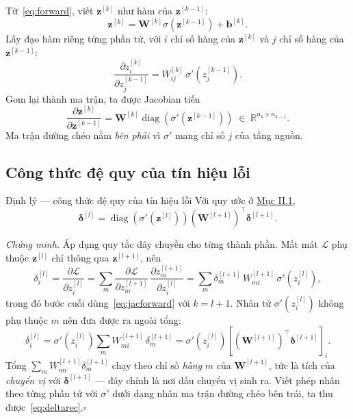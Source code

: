 Từ~\eqref{eq:forward}, viết $\mathbf{z}^{[k]}$ như hàm của
$\mathbf{z}^{[k-1]}$:
\[
  \mathbf{z}^{[k]}
  = \mathbf{W}^{[k]}\sigma\!\left(\mathbf{z}^{[k-1]}\right) + \mathbf{b}^{[k]}.
\]
Lấy đạo hàm riêng từng phần tử, với $i$ chỉ số hàng của $\mathbf{z}^{[k]}$ và $j$
chỉ số hàng của $\mathbf{z}^{[k-1]}$:
\[
  \frac{\partial z^{[k]}_i}{\partial z^{[k-1]}_j}
  = W^{[k]}_{ij}\,\sigma'\!\left(z^{[k-1]}_j\right).
\]
Gom lại thành ma trận, ta được Jacobian tiến
\begin{equation}
  \frac{\partial \mathbf{z}^{[k]}}{\partial \mathbf{z}^{[k-1]}}
  = \mathbf{W}^{[k]}\operatorname{diag}\!\left(\sigma'\!\left(\mathbf{z}^{[k-1]}\right)\right)
  \;\in\;\mathbb{R}^{n_k\times n_{k-1}}.
  \label{eq:jacforward}
\end{equation}
Ma trận đường chéo nằm \emph{bên phải} vì $\sigma'$ mang chỉ số $j$ của tầng
nguồn.

\subsection{Công thức đệ quy của tín hiệu lỗi}

\begin{infobox}{Định lý --- công thức đệ quy của tín hiệu lỗi}
Với quy ước ở \hyperref[subsec:kyhieu]{Mục II.1},
\begin{equation}
  \boldsymbol{\delta}^{[l]}
  = \operatorname{diag}\!\left(\sigma'\!\left(\mathbf{z}^{[l]}\right)\right)
    \left(\mathbf{W}^{[l+1]}\right)^{\!\top}\boldsymbol{\delta}^{[l+1]} .
  \label{eq:deltarec}
\end{equation}
\end{infobox}

\noindent\textit{Chứng minh.}\;
Áp dụng quy tắc dây chuyền cho từng thành phần. Mất mát $\mathcal{L}$ phụ thuộc
$\mathbf{z}^{[l]}$ chỉ thông qua $\mathbf{z}^{[l+1]}$, nên
\[
  \delta^{[l]}_i
  = \frac{\partial\mathcal{L}}{\partial z^{[l]}_i}
  = \sum_{m} \frac{\partial\mathcal{L}}{\partial z^{[l+1]}_m}\,
             \frac{\partial z^{[l+1]}_m}{\partial z^{[l]}_i}
  = \sum_{m} \delta^{[l+1]}_m\, W^{[l+1]}_{mi}\,\sigma'\!\left(z^{[l]}_i\right),
\]
trong đó bước cuối dùng~\eqref{eq:jacforward} với $k=l+1$. Nhân tử
$\sigma'(z^{[l]}_i)$ không phụ thuộc $m$ nên đưa được ra ngoài tổng:
\[
  \delta^{[l]}_i
  = \sigma'\!\left(z^{[l]}_i\right)\sum_{m} W^{[l+1]}_{mi}\,\delta^{[l+1]}_m
  = \sigma'\!\left(z^{[l]}_i\right)
    \left[\left(\mathbf{W}^{[l+1]}\right)^{\!\top}\boldsymbol{\delta}^{[l+1]}\right]_i .
\]
Tổng $\sum_m W^{[l+1]}_{mi}\delta^{[l+1]}_m$ chạy theo chỉ số \emph{hàng} $m$ của
$\mathbf{W}^{[l+1]}$, tức là tích của \emph{chuyển vị} với
$\boldsymbol{\delta}^{[l+1]}$ --- đây chính là nơi dấu chuyển vị sinh ra. Viết
phép nhân theo từng phần tử với $\sigma'$ dưới dạng nhân ma trận đường chéo bên
trái, ta thu được~\eqref{eq:deltarec}.\hfill$\square$

